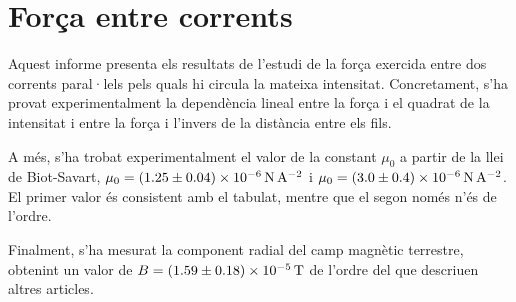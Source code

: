\chapter{Força entre corrents}
\begin{resum}
Aquest informe presenta els resultats de l'estudi de la força exercida entre dos corrents paral·lels pels quals hi circula la mateixa intensitat. Concretament, s'ha provat experimentalment la dependència lineal entre la força i el quadrat de la intensitat i entre la força i l'invers de la distància entre els fils.

A més, s'ha trobat experimentalment el valor de la constant \( \mu_0 \) a partir de la llei de Biot-Savart, \( \mu_0 = \data{1.25}{0.04e-6}{N.A^{-2}} \) i \( \mu_0 = \data{3.0}{0.4d-6}{N.A^{-2}} \). El primer valor és consistent amb el tabulat, mentre que el segon només n'és de l'ordre. 

Finalment, s'ha mesurat la component radial del camp magnètic terrestre, obtenint un valor de \( B = \data{1.59}{0.18d-5}{T} \) de l'ordre del que descriuen altres articles.
\end{resum}

